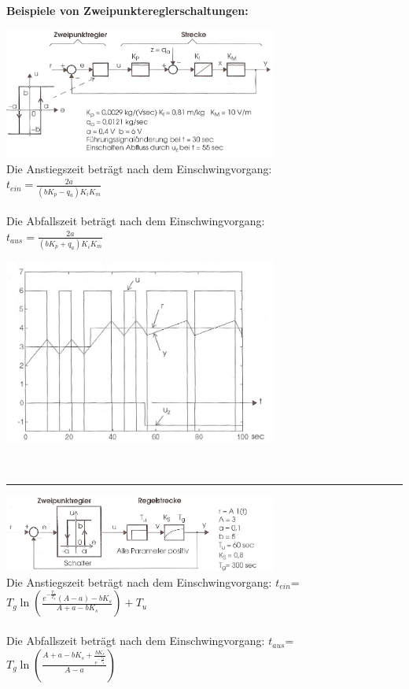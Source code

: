 		\textbf{Beispiele von Zweipunktereglerschaltungen: }\\
		\begin{minipage}{9cm}
			\vspace{.5cm}        
	 		\includegraphics[width=9cm]{./bilder/Zweipunktregler-b+b2.jpg}\\
			Die Anstiegszeit beträgt nach dem Einschwingvorgang:\\
			$t_{ein}=\frac{2a}{(b K_p - q_a)K_i K_m}$ \\ \\
			Die Abfallszeit beträgt nach dem Einschwingvorgang:\\
			$t_{aus}=\frac{2a}{(b K_p + q_a)K_i K_m}$
        \end{minipage}
		\begin{minipage}{9cm}
			\vspace{.5cm}        
			\includegraphics[width=9cm]{./bilder/Zweipunktregler-b+b_dia.jpg}
        \end{minipage}\\
	\vspace{.5cm}
	\hrule
	\vspace{.5cm}
		\begin{minipage}{9cm}
 		\includegraphics[width=9cm]{./bilder/ZweipunktreglerTotglied2.jpg}\\
			Die Anstiegszeit beträgt nach dem Einschwingvorgang:
			$t_{ein}$=$T_g\ln(\frac{e^{-\frac{T_u}{T_g}}(A-a)-b K_s}{A+a-b K_s})+T_u$\\ \\
			Die Abfallszeit beträgt nach dem Einschwingvorgang:
			$t_{aus}$=$T_g\ln(\frac{A+a-b
			K_s+\frac{b K_s}{e^{-\frac{T_u}{T_g}}}}{A-a})$\\
        \end{minipage}
